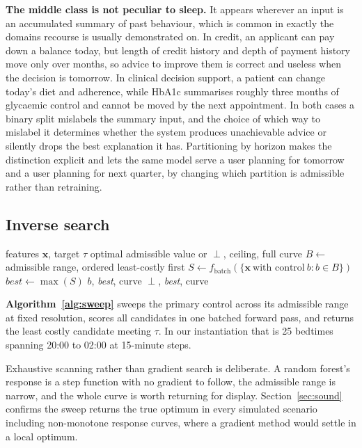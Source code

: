 \documentclass[conference,letterpaper]{IEEEtran}
\begin{document}
\textbf{The middle class is not peculiar to sleep.} It appears wherever an input
is an accumulated summary of past behaviour, which is common in exactly the
domains recourse is usually demonstrated on. In credit, an applicant can pay
down a balance today, but length of credit history and depth of payment history
move only over months, so advice to improve them is correct and useless when the
decision is tomorrow. In clinical decision support, a patient can change today's
diet and adherence, while HbA1c summarises roughly three months of glycaemic
control and cannot be moved by the next appointment. In both cases a binary
split mislabels the summary input, and the choice of which way to mislabel it
determines whether the system produces unachievable advice or silently drops the
best explanation it has. Partitioning by horizon makes the distinction explicit
and lets the same model serve a user planning for tomorrow and a user planning
for next quarter, by changing which partition is admissible rather than
retraining.

\subsection{Inverse search}

\begin{algorithm}[t]
\caption{Primary-control sweep}
\label{alg:sweep}
\begin{algorithmic}[1]
\Require features $\mathbf{x}$, target $\tau$
\Ensure optimal admissible value or $\perp$, ceiling, full curve
\State $B \gets$ admissible range, ordered least-costly first
\State $S \gets f_{\text{batch}}(\{\mathbf{x}\ \text{with control}\ b : b \in B\})$
\State $\textit{best} \gets \max(S)$
   \Return $b$, \textit{best}, curve 
  \EndIf
\EndFor
\State \Return $\perp$, \textit{best}, curve
\end{algorithmic}
\end{algorithm}

\textbf{Algorithm~\ref{alg:sweep}} sweeps the primary control across its
admissible range at fixed resolution, scores all candidates in one batched
forward pass, and returns the least costly candidate meeting $\tau$. In our
instantiation that is 25 bedtimes spanning 20:00 to 02:00 at 15-minute steps.

Exhaustive scanning rather than gradient search is deliberate. A random forest's
response is a step function with no gradient to follow, the admissible range is
narrow, and the whole curve is worth returning for display.
Section~\ref{sec:sound} confirms the sweep returns the true optimum in every
simulated scenario including non-monotone response curves, where a gradient
method would settle in a local optimum.
\end{document}
